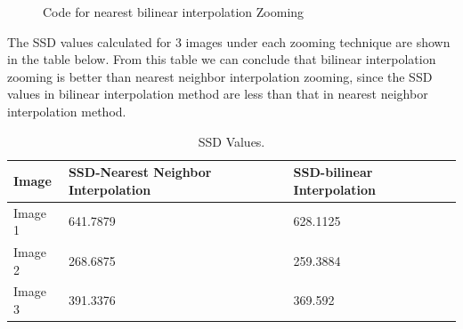 \documentclass[11pt]{article}
\begin{document}
\begin{flushleft}
\begin{itemize}
\begin{figure}[htp]
        \caption{Code for nearest bilinear interpolation Zooming}
    \end{figure}
\end{itemize}
The SSD values calculated for 3 images under each zooming technique are shown in the table below. From this table we can conclude that bilinear interpolation zooming is better than nearest neighbor interpolation zooming, since the SSD values in bilinear interpolation method are less than that in nearest neighbor interpolation method.
\begin{table}[h!]
\centering
\begin{tabular}{ | m{3cm} | m{7.5cm} | m{5.5cm} | } 
    \hline
    \textbf{Image} & \textbf{SSD-Nearest Neighbor Interpolation} &\textbf{SSD-bilinear Interpolation}\\
    \hline
    Image 1        & 641.7879      &628.1125\\
    \hline
    Image 2        & 268.6875    & 259.3884\\
    \hline
    Image 3        & 391.3376    & 369.592\\
    \hline
\end{tabular}
\caption{SSD Values.}
\label{table:1}
\end{table}

\newpage
\vspace*{-1cm}
\hspace*{-3.6cm}

\end{flushleft}
\end{document}
